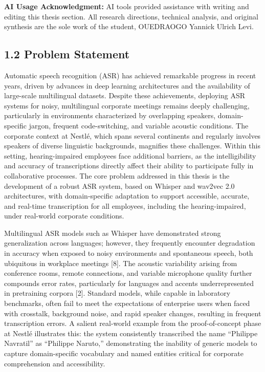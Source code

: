 \documentclass[12pt,a4paper]{article}
\begin{document}
\textbf{AI Usage Acknowledgment:} AI tools provided assistance with writing and editing this thesis section. All research directions, technical analysis, and original synthesis are the sole work of the student, OUEDRAOGO Yannick Ulrich Levi.


\subsection{1.2 Problem Statement}


Automatic speech recognition (ASR) has achieved remarkable progress in recent years, driven by advances in deep learning architectures and the availability of large-scale multilingual datasets. Despite these achievements, deploying ASR systems for noisy, multilingual corporate meetings remains deeply challenging, particularly in environments characterized by overlapping speakers, domain-specific jargon, frequent code-switching, and variable acoustic conditions. The corporate context at Nestlé, which spans several continents and regularly involves speakers of diverse linguistic backgrounds, magnifies these challenges. Within this setting, hearing-impaired employees face additional barriers, as the intelligibility and accuracy of transcriptions directly affect their ability to participate fully in collaborative processes. The core problem addressed in this thesis is the development of a robust ASR system, based on Whisper and wav2vec 2.0 architectures, with domain-specific adaptation to support accessible, accurate, and real-time transcription for all employees, including the hearing-impaired, under real-world corporate conditions.


Multilingual ASR models such as Whisper have demonstrated strong generalization across languages; however, they frequently encounter degradation in accuracy when exposed to noisy environments and spontaneous speech, both ubiquitous in workplace meetings [8]. The acoustic variability arising from conference rooms, remote connections, and variable microphone quality further compounds error rates, particularly for languages and accents underrepresented in pretraining corpora [2]. Standard models, while capable in laboratory benchmarks, often fail to meet the expectations of enterprise users when faced with crosstalk, background noise, and rapid speaker changes, resulting in frequent transcription errors. A salient real-world example from the proof-of-concept phase at Nestlé illustrates this: the system consistently transcribed the name “Philippe Navratil” as “Philippe Naruto,” demonstrating the inability of generic models to capture domain-specific vocabulary and named entities critical for corporate comprehension and accessibility.
\end{document}
